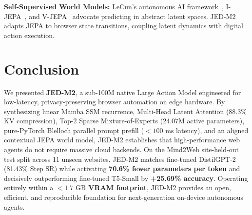 \documentclass[10pt,twocolumn,letterpaper]{article}
\begin{document}
\textbf{Self-Supervised World Models:} LeCun's autonomous AI framework~\cite{lecun2022path}, I-JEPA~\cite{assran2023ijepa}, and V-JEPA~\cite{bardes2024vjepa} advocate predicting in abstract latent spaces. JED-M2 adapts JEPA to browser state transitions, coupling latent dynamics with digital action execution.

\section{Conclusion}
\label{sec:conclusion}

We presented \textbf{JED-M2}, a sub-100M native Large Action Model engineered for low-latency, privacy-preserving browser automation on edge hardware. By synthesizing linear Mamba SSM recurrence, Multi-Head Latent Attention (88.3\% KV compression), Top-2 Sparse Mixture-of-Experts (24.07M active parameters), pure-PyTorch Blelloch parallel prompt prefill ($< 100\text{ ms}$ latency), and an aligned contextual JEPA world model, JED-M2 establishes that high-performance web agents do not require massive cloud backends. On the Mind2Web site-held-out test split across 11 unseen websites, JED-M2 matches fine-tuned DistilGPT-2 (81.43\% Step SR) while activating \textbf{70.6\% fewer parameters per token} and decisively outperforming fine-tuned T5-Small by \textbf{+25.69\% accuracy}. Operating entirely within a \textbf{$< 1.7\text{ GB}$ VRAM footprint}, JED-M2 provides an open, efficient, and reproducible foundation for next-generation on-device autonomous agents.



\end{document}

